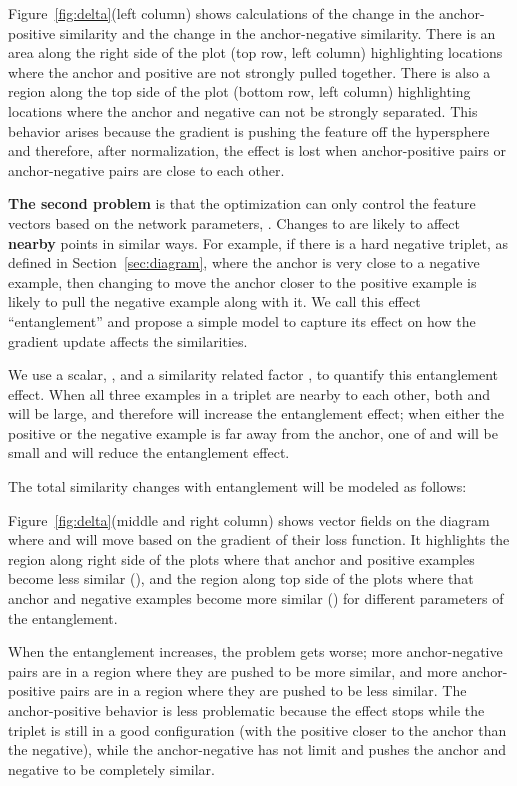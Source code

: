 \documentclass[runningheads]{llncs}
\begin{document}
Figure~\ref{fig:delta}(left column) shows calculations of the change in the anchor-positive similarity and the change in the anchor-negative similarity.  There is an area along the right side of the  plot (top row, left column) highlighting locations where the anchor and positive are not strongly pulled together. There is also a region along the top side of the  plot (bottom row, left column) highlighting locations where the anchor and negative can not be strongly separated. This behavior arises because the gradient is pushing the feature off the hypersphere and therefore, after normalization, the effect is lost when anchor-positive pairs or anchor-negative pairs are close to each other. 

{\bf The second problem} is that the optimization can only control the feature vectors based on the network parameters, .  Changes to  are likely to affect \textbf{nearby} points in similar ways.  For example, if there is a hard negative triplet, as defined in Section~\ref{sec:diagram}, where the anchor is very close to a negative example, then changing  to move the anchor closer to the positive example is likely to pull the negative example along with it.  We call this effect ``entanglement'' and propose a simple model to capture its effect on how the gradient update affects the similarities. 

We use a scalar, , and a similarity related factor , to quantify this entanglement effect. When all three examples in a triplet are nearby to each other, both  and  will be large, and therefore  will increase the entanglement effect; when either the positive or the negative example is far away from the anchor, one of  and  will be small and  will reduce the entanglement effect.

The total similarity changes with entanglement will be modeled as follows:


Figure~\ref{fig:delta}(middle and right column) shows vector fields on the diagram where  and  will move based on the gradient of their loss function. It highlights the region along right side of the plots where that anchor and positive examples become less similar (), and the region along top side of the plots where that anchor and negative examples become more similar  () for different parameters of the entanglement. 

When the entanglement increases, the problem gets worse; more anchor-negative pairs are in a region where they are pushed to be more similar, and more anchor-positive pairs are in a region where they are pushed to be less similar.  The anchor-positive behavior is less problematic because the effect stops while the triplet is still in a good configuration (with the positive closer to the anchor than the negative), while the anchor-negative has not limit and pushes the anchor and negative to be completely similar.
\end{document}
